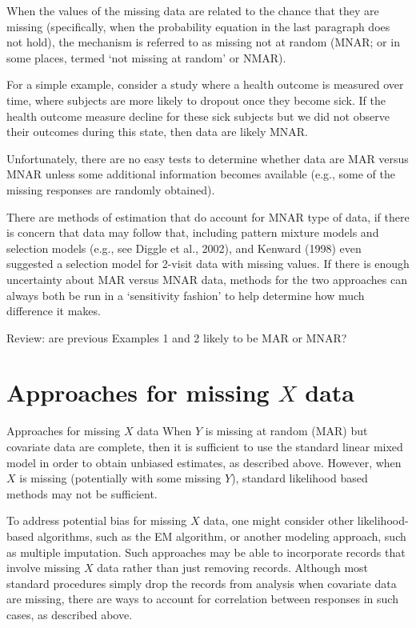 \documentclass[
  9pt,
  ignorenonframetext,
]{beamer}
\begin{document}
\begin{frame}{}
\protect\hypertarget{section-3}{}
When the values of the missing data are related to the chance that they
are missing (specifically, when the probability equation in the last
paragraph does not hold), the mechanism is referred to as missing not at
random (MNAR; or in some places, termed `not missing at random' or
NMAR).

For a simple example, consider a study where a health outcome is
measured over time, where subjects are more likely to dropout once they
become sick. If the health outcome measure decline for these sick
subjects but we did not observe their outcomes during this state, then
data are likely MNAR.

Unfortunately, there are no easy tests to determine whether data are MAR
versus MNAR unless some additional information becomes available (e.g.,
some of the missing responses are randomly obtained).
\end{frame}

\begin{frame}{}
\protect\hypertarget{section-4}{}
There are methods of estimation that do account for MNAR type of data,
if there is concern that data may follow that, including pattern mixture
models and selection models (e.g., see Diggle et al., 2002), and Kenward
(1998) even suggested a selection model for 2-visit data with missing
values. If there is enough uncertainty about MAR versus MNAR data,
methods for the two approaches can always both be run in a `sensitivity
fashion' to help determine how much difference it makes.

Review: are previous Examples 1 and 2 likely to be MAR or MNAR?
\end{frame}

\hypertarget{approaches-for-missing-x-data}{%
\section{\texorpdfstring{Approaches for missing \(X\)
data}{Approaches for missing X data}}\label{approaches-for-missing-x-data}}

\begin{frame}{Approaches for missing \(X\) data}
\protect\hypertarget{approaches-for-missing-x-data-1}{}
When \(Y\) is missing at random (MAR) but covariate data are complete,
then it is sufficient to use the standard linear mixed model in order to
obtain unbiased estimates, as described above. However, when \(X\) is
missing (potentially with some missing \(Y\)), standard likelihood based
methods may not be sufficient.

To address potential bias for missing \(X\) data, one might consider
other likelihood-based algorithms, such as the EM algorithm, or another
modeling approach, such as multiple imputation. Such approaches may be
able to incorporate records that involve missing \(X\) data rather than
just removing records. Although most standard procedures simply drop the
records from analysis when covariate data are missing, there are ways to
account for correlation between responses in such cases, as described
above.
\end{frame}
\end{document}
